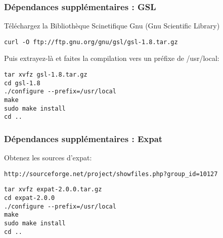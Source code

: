 \subsubsection{D\'ependances suppl\'ementaires : GSL}
T\'el\'echargez la Biblioth\`eque Scinetifique Gnu (Gnu Scientific Library)

\begin{verbatim}
curl -O ftp://ftp.gnu.org/gnu/gsl/gsl-1.8.tar.gz 
\end{verbatim}

Puis extrayez-l\`a et faites la compilation vers un pr\'efixe de /usr/local:

\begin{verbatim}
tar xvfz gsl-1.8.tar.gz 
cd gsl-1.8 
./configure --prefix=/usr/local 
make
sudo make install
cd ..  
\end{verbatim}

% 
% 

\subsubsection{D\'ependances suppl\'ementaires : Expat}
Obtenez les sources d'expat:

\begin{verbatim}
http://sourceforge.net/project/showfiles.php?group_id=10127 
\end{verbatim}

\begin{verbatim}
tar xvfz expat-2.0.0.tar.gz 
cd expat-2.0.0 
./configure --prefix=/usr/local
make 
sudo make install 
cd ..  
\end{verbatim}

